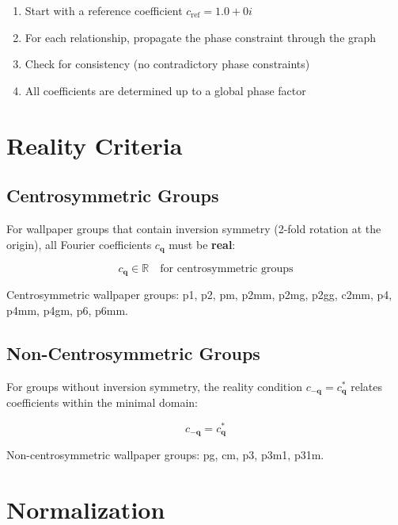 \begin{enumerate}
    \item Start with a reference coefficient $c_{\text{ref}} = 1.0 + 0i$
    \item For each relationship, propagate the phase constraint through the graph
    \item Check for consistency (no contradictory phase constraints)
    \item All coefficients are determined up to a global phase factor
\end{enumerate}

\section{Reality Criteria}

\subsection{Centrosymmetric Groups}

For wallpaper groups that contain inversion symmetry (2-fold rotation at the origin), all Fourier coefficients $c_{\boldsymbol{q}}$ must be \textbf{real}:

\begin{equation}
    c_{\boldsymbol{q}} \in \mathbb{R} \quad \text{for centrosymmetric groups}
\end{equation}

Centrosymmetric wallpaper groups: p1, p2, pm, p2mm, p2mg, p2gg, c2mm, p4, p4mm, p4gm, p6, p6mm.

\subsection{Non-Centrosymmetric Groups}

For groups without inversion symmetry, the reality condition $c_{-\boldsymbol{q}} = c_{\boldsymbol{q}}^*$ relates coefficients within the minimal domain:

\begin{equation}
    c_{-\boldsymbol{q}} = c_{\boldsymbol{q}}^*
\end{equation}

Non-centrosymmetric wallpaper groups: pg, cm, p3, p3m1, p31m.

\section{Normalization}

